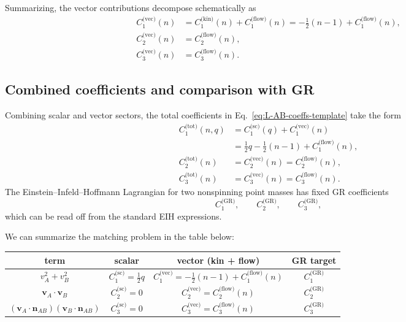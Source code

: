 \documentclass[11pt]{article}
\begin{document}
Summarizing, the vector contributions decompose schematically as
\begin{align}
  C_{1}^{\text{(vec)}}(n)
  &= C_{1}^{\text{(kin)}}(n) + C_{1}^{\text{(flow)}}(n)
   = -\frac{1}{2} (n-1) + C_{1}^{\text{(flow)}}(n), \\
  C_{2}^{\text{(vec)}}(n)
  &= C_{2}^{\text{(flow)}}(n), \\
  C_{3}^{\text{(vec)}}(n)
  &= C_{3}^{\text{(flow)}}(n).
\end{align}

\subsection{Combined coefficients and comparison with GR}
\label{app:combined-coeffs}

Combining scalar and vector sectors, the total coefficients in
Eq.~\eqref{eq:L-AB-coeffs-template} take the form
\begin{align}
  C_{1}^{\text{(tot)}}(n,q)
  &= C_{1}^{\text{(sc)}}(q)
    + C_{1}^{\text{(vec)}}(n) \nonumber \\
  &= \frac{1}{2} q
    - \frac{1}{2} (n-1)
    + C_{1}^{\text{(flow)}}(n), \label{eq:C1-tot} \\
  C_{2}^{\text{(tot)}}(n)
  &= C_{2}^{\text{(vec)}}(n)
   = C_{2}^{\text{(flow)}}(n), \label{eq:C2-tot} \\
  C_{3}^{\text{(tot)}}(n)
  &= C_{3}^{\text{(vec)}}(n)
   = C_{3}^{\text{(flow)}}(n). \label{eq:C3-tot}
\end{align}
The Einstein--Infeld--Hoffmann Lagrangian for two nonspinning point masses
has fixed GR coefficients
\begin{equation}
  C_{1}^{\text{(GR)}},
  \qquad
  C_{2}^{\text{(GR)}},
  \qquad
  C_{3}^{\text{(GR)}},
\end{equation}
which can be read off from the standard EIH expressions.

We can summarize the matching problem in the table below:

\begin{center}
\begin{tabular}{c|c|c|c}
  term & scalar & vector (kin + flow) & GR target \\
  \hline
  \(v_A^2 + v_B^2\) &
  \(C_{1}^{\text{(sc)}} = \tfrac{1}{2} q\) &
  \(C_{1}^{\text{(vec)}} = -\tfrac{1}{2} (n-1) + C_{1}^{\text{(flow)}}(n)\) &
  \(C_{1}^{\text{(GR)}}\) \\
  \(\mathbf{v}_A \cdot \mathbf{v}_B\) &
  \(C_{2}^{\text{(sc)}} = 0\) &
  \(C_{2}^{\text{(vec)}} = C_{2}^{\text{(flow)}}(n)\) &
  \(C_{2}^{\text{(GR)}}\) \\
  \((\mathbf{v}_A \cdot \mathbf{n}_{AB})
    (\mathbf{v}_B \cdot \mathbf{n}_{AB})\) &
  \(C_{3}^{\text{(sc)}} = 0\) &
  \(C_{3}^{\text{(vec)}} = C_{3}^{\text{(flow)}}(n)\) &
  \(C_{3}^{\text{(GR)}}\)
\end{tabular}
\end{center}
\end{document}
